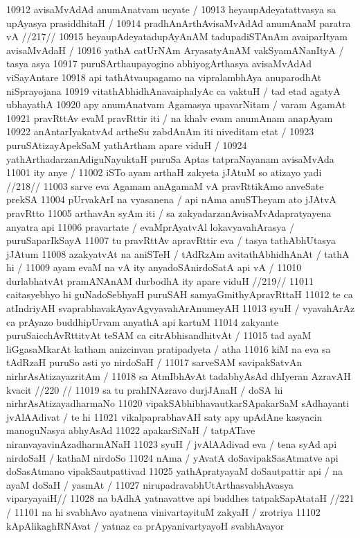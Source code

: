 10912 avisaMvAdAd anumAnatvam ucyate /
10913 	heyaupAdeyatattvasya sa upAyasya prasiddhitaH /
10914 	pradhAnArthAvisaMvAdAd anumAnaM paratra vA //217// 
10915 heyaupAdeyatadupAyAnAM tadupadiSTAnAm avaiparItyam avisaMvAdaH /
10916 yathA catUrNAm AryasatyAnAM vakSyamANanItyA / tasya asya
10917 puruSArthaupayogino abhiyogArthasya avisaMvAdAd viSayAntare
10918 api tathAtvaupagamo na vipralambhAya anuparodhAt niSprayojana 
10919 vitathAbhidhAnavaiphalyAc ca vaktuH / tad etad agatyA ubhayathA 
10920 apy anumAnatvam Agamasya upavarNitam / varam AgamAt 
10921 pravRttAv evaM pravRttir iti / na khalv evam anumAnam anapAyam
10922 anAntarIyakatvAd artheSu zabdAnAm iti niveditam etat /
10923 	puruSAtizayApekSaM yathArtham apare viduH /
10924 yathArthadarzanAdiguNayuktaH puruSa Aptas tatpraNayanam avisaMvAda
11001 ity anye / 
11002 	iSTo ayam arthaH zakyeta jJAtuM so atizayo yadi //218// 
11003 sarve eva Agamam anAgamaM vA pravRttikAmo anveSate prekSA 
11004 pUrvakArI na vyasanena / api nAma anuSTheyam ato jJAtvA pravRtto
11005 arthavAn syAm iti / sa zakyadarzanAvisaMvAdapratyayena anyatra api 
11006 pravartate / evaMprAyatvAl lokavyavahArasya / puruSaparIkSayA
11007 tu pravRttAv apravRttir eva / tasya tathAbhUtasya jJAtum  
11008 azakyatvAt na aniSTeH / tAdRzAm avitathAbhidhAnAt / tathA hi / 
11009 	ayam evaM na vA ity anyadoSAnirdoSatA api vA /  
11010 	durlabhatvAt pramANAnAM durbodhA ity apare viduH //219//  
11011 caitasyebhyo hi guNadoSebhyaH puruSAH samyaGmithyApravRttaH 
11012 te ca atIndriyAH svaprabhavakAyavAgvyavahArAnumeyAH  
11013 syuH / vyavahArAz ca prAyazo buddhipUrvam anyathA api kartuM  
11014 zakyante puruSaicchAvRttitvAt teSAM ca citrAbhisandhitvAt / 
11015 tad ayaM liGgasaMkarAt katham anizcinvan pratipadyeta / atha
11016 kiM na eva sa tAdRzaH puruSo asti yo nirdoSaH /  
11017 	sarveSAM savipakSatvAn nirhrAsAtizayazritAm /  
11018 	sa AtmIbhAvAt tadabhyAsAd dhIyeran AzravAH kvacit //220 //
11019 sa tu prahINAzravo durjJAnaH / doSA hi nirhrAsAtizayadharmaNo
11020 vipakSAbhibhavautkarSApakarSaM sAdhayanti jvAlAAdivat / te hi  
11021 vikalpaprabhavAH saty apy upAdAne kasyacin manoguNasya abhyAsAd 
11022 apakarSiNaH / tatpATave niranvayavinAzadharmANaH  
11023 syuH / jvAlAAdivad eva / tena syAd api nirdoSaH / kathaM nirdoSo 
11024 nAma / yAvatA doSavipakSasAtmatve api doSasAtmano vipakSautpattivad
11025 yathApratyayaM doSautpattir api / na ayaM doSaH / yasmAt /
11027 	nirupadravabhUtArthasvabhAvasya viparyayaiH//
11028 	na bAdhA yatnavattve api buddhes tatpakSapAtataH //221 /  
11101 na hi svabhAvo ayatnena vinivartayituM zakyaH / zrotriya 
11102 kApAlikaghRNAvat / yatnaz ca prApyanivartyayoH svabhAvayor  
